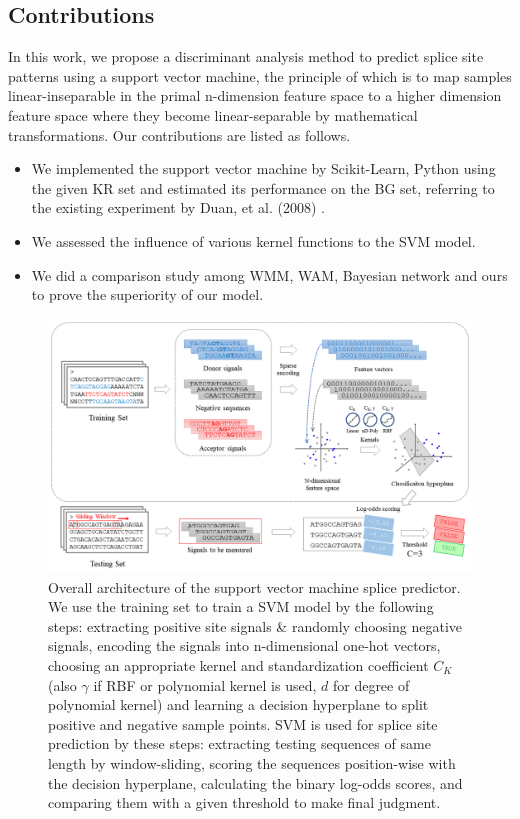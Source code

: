 \documentclass[journal,twoside]{IEEEtran}
\begin{document}
\subsection{Contributions}\label{1.2}

In this work, we propose a discriminant analysis method to predict splice site patterns using a support vector machine, the principle of which is to map samples linear-inseparable in the primal n-dimension feature space to a higher dimension feature space where they become linear-separable by mathematical transformations. Our contributions are listed as follows. 

\begin{itemize}
\item We implemented the support vector machine by Scikit-Learn, Python \cite{pedregosa2011scikit} using the given KR set and estimated its performance on the BG set, referring to the existing experiment by Duan, et al. (2008) \cite{duan2008position}.
\item We assessed the influence of various kernel functions to the SVM model. 
\item We did a comparison study among WMM, WAM, Bayesian network and ours to prove the superiority of our model. 
\end{itemize}

\begin{figure}[htbp]
\centerline{\includegraphics[scale=0.5]{Pics/SVM.png}}
\caption{Overall architecture of the support vector machine splice predictor. We use the training set to train a SVM model by the following steps: extracting positive site signals \& randomly choosing negative signals, encoding the signals into n-dimensional one-hot vectors, choosing an appropriate kernel and standardization coefficient $C_K$ (also $\gamma$ if RBF or polynomial kernel is used, $d$ for degree of polynomial kernel) and learning a decision hyperplane to split positive and negative sample points. SVM is used for splice site prediction by these steps: extracting testing sequences of same length by window-sliding, scoring the sequences position-wise with the decision hyperplane, calculating the binary log-odds scores, and comparing them with a given threshold to make final judgment. }
\label{fig2}
\end{figure}
\end{document}
